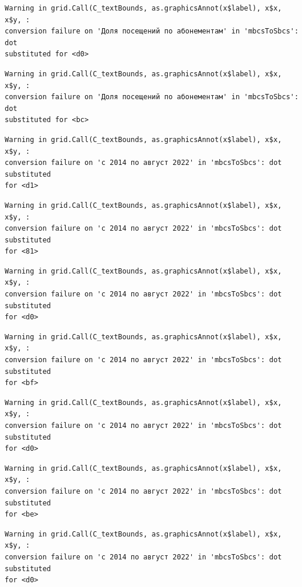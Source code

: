 \documentclass[
  letterpaper,
  DIV=11,
  numbers=noendperiod]{scrartcl}
\begin{document}
\begin{verbatim}
Warning in grid.Call(C_textBounds, as.graphicsAnnot(x$label), x$x, x$y, :
conversion failure on 'Доля посещений по абонементам' in 'mbcsToSbcs': dot
substituted for <d0>
\end{verbatim}

\begin{verbatim}
Warning in grid.Call(C_textBounds, as.graphicsAnnot(x$label), x$x, x$y, :
conversion failure on 'Доля посещений по абонементам' in 'mbcsToSbcs': dot
substituted for <bc>
\end{verbatim}

\begin{verbatim}
Warning in grid.Call(C_textBounds, as.graphicsAnnot(x$label), x$x, x$y, :
conversion failure on 'с 2014 по август 2022' in 'mbcsToSbcs': dot substituted
for <d1>
\end{verbatim}

\begin{verbatim}
Warning in grid.Call(C_textBounds, as.graphicsAnnot(x$label), x$x, x$y, :
conversion failure on 'с 2014 по август 2022' in 'mbcsToSbcs': dot substituted
for <81>
\end{verbatim}

\begin{verbatim}
Warning in grid.Call(C_textBounds, as.graphicsAnnot(x$label), x$x, x$y, :
conversion failure on 'с 2014 по август 2022' in 'mbcsToSbcs': dot substituted
for <d0>
\end{verbatim}

\begin{verbatim}
Warning in grid.Call(C_textBounds, as.graphicsAnnot(x$label), x$x, x$y, :
conversion failure on 'с 2014 по август 2022' in 'mbcsToSbcs': dot substituted
for <bf>
\end{verbatim}

\begin{verbatim}
Warning in grid.Call(C_textBounds, as.graphicsAnnot(x$label), x$x, x$y, :
conversion failure on 'с 2014 по август 2022' in 'mbcsToSbcs': dot substituted
for <d0>
\end{verbatim}

\begin{verbatim}
Warning in grid.Call(C_textBounds, as.graphicsAnnot(x$label), x$x, x$y, :
conversion failure on 'с 2014 по август 2022' in 'mbcsToSbcs': dot substituted
for <be>
\end{verbatim}

\begin{verbatim}
Warning in grid.Call(C_textBounds, as.graphicsAnnot(x$label), x$x, x$y, :
conversion failure on 'с 2014 по август 2022' in 'mbcsToSbcs': dot substituted
for <d0>
\end{verbatim}
\end{document}
